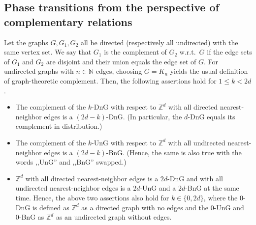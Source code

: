 \documentclass[oneside]{amsart}
\newcommand{\N}{\mathbb{N}}
\theoremstyle{definition}
\newcommand{\1}{\mathbbm{1}}
\newcommand{\0}{\mathbf{o}}
\newcommand{\Z}{\mathbb{Z}}
\numberwithin{equation}{section}
\begin{document}
\subsection{Phase transitions from the perspective of complementary relations}\label{sec:phases}
Let the graphs $G,G_1,G_2$ all be directed (respectively all undirected) with the same vertex set. We say that $G_1$ is the complement of $G_2$ w.r.t.\ $G$ if the edge sets of $G_1$ and $G_2$ are disjoint and their union equals the edge set of $G$. For undirected graphs with $n \in \N$ edges, choosing $G=K_n$ yields the usual definition of graph-theoretic complement. Then, the following assertions hold for $1 \leq k < 2d$.
\begin{itemize}
    \item The complement of the $k$-DnG with respect to $\Z^d$ with all directed nearest-neighbor edges is a $(2d-k)$-DnG. (In particular, the $d$-DnG equals its complement in distribution.)
    \item The complement of the $k$-UnG with respect to $\Z^d$ with all undirected nearest-neighbor edges is a $(2d-k)$-BnG. (Hence, the same is also true with the words ,,UnG'' and ,,BnG'' swapped.) 
    \item $\Z^d$ with all directed nearest-neighbor edges is a $2d$-DnG and with all undirected nearest-neighbor edges is a $2d$-UnG and a $2d$-BnG at the same time. Hence, the above two assertions also hold for $k \in \{ 0, 2d\}$, where the 0-DnG is defined as $\Z^d$ as a directed graph with no edges and the 0-UnG and 0-BnG as $\Z^d$ as an undirected graph without edges.
\end{itemize}
\end{document}
